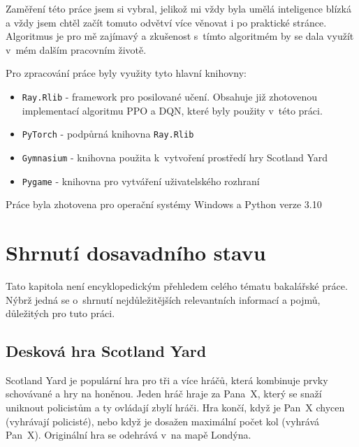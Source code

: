 Zaměření této práce jsem si vybral, jelikož mi vždy byla umělá inteligence blízká a vždy jsem chtěl začít tomuto odvětví více věnovat i po praktické stránce.
Algoritmus je pro mě zajímavý a zkušenost s~tímto algoritmém by se dala využít v~mém dalším pracovním životě.\newpage

Pro zpracování práce byly využity tyto hlavní knihovny:
\begin{itemize}
  \item \texttt{Ray.Rlib} - framework pro posilované učení. Obsahuje již zhotovenou implementací algoritmu PPO a DQN, které byly použity v~této práci. 
  \item \texttt{PyTorch} - podpůrná knihovna \texttt{Ray.Rlib}
  \item \texttt{Gymnasium} - knihovna použita k~vytvoření prostředí hry Scotland Yard
  \item \texttt{Pygame} - knihovna pro vytváření uživatelského rozhraní
\end{itemize}

Práce byla zhotovena pro operační systémy Windows a Python verze 3.10

\chapter{Shrnutí dosavadního stavu}
\label{ch:dosavadni_stav}
Tato kapitola není encyklopedickým přehledem celého tématu bakalářské práce.
Nýbrž jedná se o~shrnutí nejdůležitějších relevantních informací a pojmů, důležitých pro tuto práci.

\section{Desková hra Scotland Yard}
\label{sec:deskova-hra-scotland-yard}

Scotland Yard je populární hra pro tři a více hráčů, která kombinuje prvky schovávané a hry na honěnou.
Jeden hráč hraje za Pana~X, který se snaží uniknout policistům a ty ovládají zbylí hráči.
Hra končí, když je Pan~X chycen (vyhrávají policisté), nebo když je dosažen maximální počet kol (vyhrává Pan~X).
Originální hra se odehrává v~na mapě Londýna.

